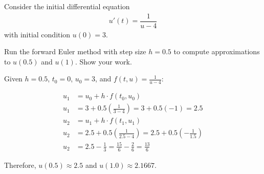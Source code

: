 \documentclass[reqno]{exam}
\begin{document}
\begin{questions}
\begin{solution}
  \end{solution}

  \newpage
  \question[10]
  Consider the initial differential equation
  \begin{align*}
    u'(t) = \dfrac{1}{u - 4}
  \end{align*}
  with initial condition $u(0) = 3$.

  Run the forward Euler method with step size $h = 0.5$ to compute approximations to $u(0.5)$ and $u(1)$. Show your work.

  \begin{solution}

    Given $h = 0.5$, $t_0 = 0$, $u_0 = 3$, and $f(t, u) = \frac{1}{u-4}$:

    \begin{align*}
      u_1 & = u_0 + h \cdot f(t_0, u_0)                                                          \\
      u_1 & = 3 + 0.5 \left( \frac{1}{3-4} \right) = 3 + 0.5(-1) = 2.5                           \\
      u_2 & = u_1 + h \cdot f(t_1, u_1)                                                          \\
      u_2 & = 2.5 + 0.5 \left( \frac{1}{2.5-4} \right) = 2.5 + 0.5 \left( -\frac{1}{1.5} \right) \\
      u_2 & = 2.5 - \frac{1}{3} = \frac{15}{6} - \frac{2}{6} = \frac{13}{6}
    \end{align*}

    Therefore, $u(0.5) \approx 2.5$ and $u(1.0) \approx 2.1667$.
  \end{solution}

\end{questions}
\end{document}

